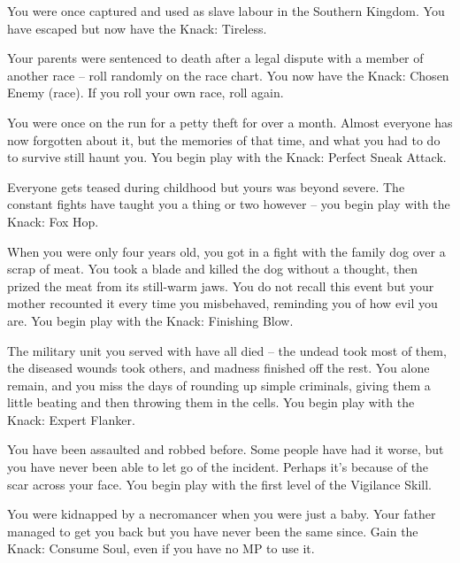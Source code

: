 \begin{multicols}{2}
\begin{list}{\addtocounter{list}{1}\textbf{:}}{\raggedleft}
\item{You were once captured and used as slave labour in the Southern Kingdom.  You have escaped but now have the Knack: Tireless.}

\item{Your parents were sentenced to death after a legal dispute with a member of another race -- roll randomly on the race chart.  You now have the Knack: Chosen Enemy (race).  If you roll your own race, roll again.}

\item{You were once on the run for a petty theft for over a month.  Almost everyone has now forgotten about it, but the memories of that time, and what you had to do to survive still haunt you.  You begin play with the Knack: Perfect Sneak Attack.}

\item{Everyone gets teased during childhood but yours was beyond severe.  The constant fights have taught you a thing or two however -- you begin play with the Knack: Fox Hop.}

\item{When you were only four years old, you got in a fight with the family dog over a scrap of meat.  You took a blade and killed the dog without a thought, then prized the meat from its still-warm jaws.  You do not recall this event but your mother recounted it every time you misbehaved, reminding you of how evil you are.  You begin play with the Knack: Finishing Blow.}

\item{The military unit you served with have all died -- the undead took most of them, the diseased wounds took others, and madness finished off the rest.  You alone remain, and you miss the days of rounding up simple criminals, giving them a little beating and then throwing them in the cells.  You begin play with the Knack: Expert Flanker.}

\item{You have been assaulted and robbed before.  Some people have had it worse, but you have never been able to let go of the incident.  Perhaps it's because of the scar across your face.  You begin play with the first level of the Vigilance Skill.}

\item{You were kidnapped by a necromancer when you were just a baby.  Your father managed to get you back but you have never been the same since.  Gain the Knack: Consume Soul, even if you have no MP to use it.}


\end{list}
\end{multicols}
